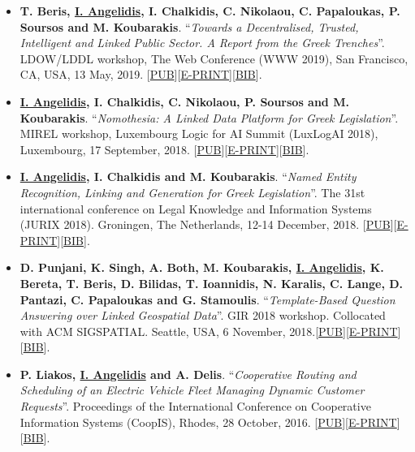 \documentclass[a4paper,oneside,10pt]{article}
\begin{document}
\begin{itemize}

\item \textbf{T. Beris, \underline{I. Angelidis}, I. Chalkidis, C. Nikolaou, C. Papaloukas, P. Soursos and M. Koubarakis}. ``\textit{Towards a Decentralised, Trusted, Intelligent and Linked Public Sector. A Report from the Greek Trenches}''. LDOW/LDDL workshop, The Web Conference (WWW 2019), San Francisco, CA, USA, 13 May, 2019. [\href{https://dl.acm.org/citation.cfm?doid=3308560.3317077}{PUB}][\href{https://iosang.github.io/documents/Publications/2019/www19companion-206.pdf}{E-PRINT}][\href{https://iosang.github.io/documents/Publications/2019/3317077.bib}{BIB}].

\item \textbf{\underline{I. Angelidis}, I. Chalkidis, C. Nikolaou, P. Soursos and M. Koubarakis}. ``\textit{Nomothesia: A Linked Data Platform for Greek Legislation}''. MIREL workshop, Luxembourg Logic for AI Summit (LuxLogAI 2018), Luxembourg, 17 September, 2018. [\href{https://ora.ox.ac.uk/objects/uuid:b19c1428-49db-402b-8afd-b8cf588e147d}{PUB}][\href{https://iosang.github.io/documents/Publications/2018/nomothesia-linked-data.pdf}{E-PRINT}][\href{https://ora.ox.ac.uk/objects/uuid:b19c1428-49db-402b-8afd-b8cf588e147d/export_record.bibtex}{BIB}].

\item \textbf{\underline{I. Angelidis}, I. Chalkidis and M. Koubarakis}. ``\textit{Named Entity Recognition, Linking and Generation for Greek Legislation}''. The 31st international conference on Legal Knowledge and Information Systems (JURIX 2018). Groningen, The Netherlands, 12-14 December‚ 2018. [\href{https://doi.org/10.3233/978-1-61499-935-5-1}{PUB}][\href{https://iosang.github.io/documents/Publications/2018/jurix2018.pdf}{E-PRINT}][\href{https://dblp.uni-trier.de/rec/bib1/conf/jurix/AngelidisCK18.bib}{BIB}].

\item \textbf{D. Punjani, K. Singh, A. Both, M. Koubarakis, \underline{I. Angelidis}, K. Bereta, T. Beris, D. Bilidas, T. Ioannidis, N. Karalis, C. Lange, D. Pantazi, C. Papaloukas and G. Stamoulis}. ``\textit{Template-Based Question Answering over Linked Geospatial Data}''. GIR 2018 workshop. Collocated with ACM SIGSPATIAL. Seattle, USA, 6 November, 2018.[\href{https://doi.org/10.1145/3281354.3281362}{PUB}][\href{https://iosang.github.io/documents/Publications/2018/template-based-GeoQA.pdf}{E-PRINT}][\href{https://dl.acm.org/downformats.cfm?id=3281362&parent_id=3281354&expformat=bibtex}{BIB}].

\item \textbf{P. Liakos, \underline{I. Angelidis} and A. Delis}. ``\textit{Cooperative Routing and Scheduling of an Electric Vehicle Fleet Managing Dynamic Customer Requests}''. Proceedings of the International Conference on Cooperative Information Systems (CoopIS), Rhodes, 28 October, 2016. [\href{https://link.springer.com/chapter/10.1007%2F978-3-319-48472-3_7}{PUB}][\href{https://iosang.github.io/documents/Publications/2016/LAD-Coopis16.pdf}{E-PRINT}][\href{https://dblp.uni-trier.de/rec/bib1/conf/otm/LiakosAD16.bib}{BIB}].

\end{itemize}
\end{document}
